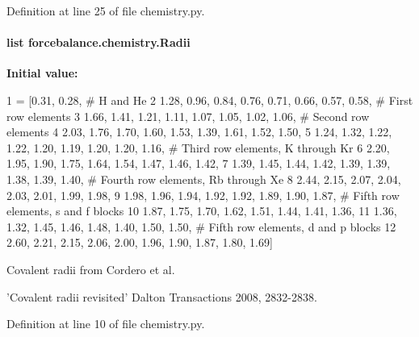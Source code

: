 Definition at line 25 of file chemistry.\-py.

\hypertarget{namespaceforcebalance_1_1chemistry_a5b56f8045a8e79c5b088a58695fa460f}{
\paragraph[{Radii}]{\setlength{\rightskip}{0pt plus 5cm}list forcebalance.\-chemistry.\-Radii}}\label{namespaceforcebalance_1_1chemistry_a5b56f8045a8e79c5b088a58695fa460f}
{\bfseries Initial value\-:}
\begin{DoxyCode}
1 = [0.31, 0.28, \textcolor{comment}{# H and He}
2          1.28, 0.96, 0.84, 0.76, 0.71, 0.66, 0.57, 0.58, \textcolor{comment}{# First row elements}
3          1.66, 1.41, 1.21, 1.11, 1.07, 1.05, 1.02, 1.06, \textcolor{comment}{# Second row elements}
4          2.03, 1.76, 1.70, 1.60, 1.53, 1.39, 1.61, 1.52, 1.50, 
5          1.24, 1.32, 1.22, 1.22, 1.20, 1.19, 1.20, 1.20, 1.16, \textcolor{comment}{# Third row elements, K through Kr}
6          2.20, 1.95, 1.90, 1.75, 1.64, 1.54, 1.47, 1.46, 1.42, 
7          1.39, 1.45, 1.44, 1.42, 1.39, 1.39, 1.38, 1.39, 1.40, \textcolor{comment}{# Fourth row elements, Rb through Xe}
8          2.44, 2.15, 2.07, 2.04, 2.03, 2.01, 1.99, 1.98, 
9          1.98, 1.96, 1.94, 1.92, 1.92, 1.89, 1.90, 1.87, \textcolor{comment}{# Fifth row elements, s and f blocks}
10          1.87, 1.75, 1.70, 1.62, 1.51, 1.44, 1.41, 1.36, 
11          1.36, 1.32, 1.45, 1.46, 1.48, 1.40, 1.50, 1.50, \textcolor{comment}{# Fifth row elements, d and p blocks}
12          2.60, 2.21, 2.15, 2.06, 2.00, 1.96, 1.90, 1.87, 1.80, 1.69]
\end{DoxyCode}


Covalent radii from Cordero et al. 

'Covalent radii revisited' Dalton Transactions 2008, 2832-\/2838. 

Definition at line 10 of file chemistry.\-py.

